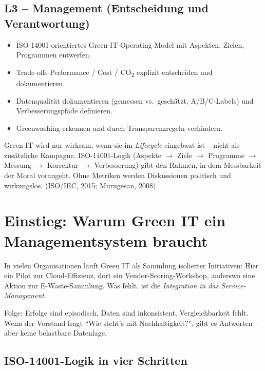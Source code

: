 \documentclass[11pt,a4paper,oneside]{article}
\newcommand{\quelle}[1]{{\footnotesize\color{lpGray}(#1)}}
\begin{document}
\subsection*{L3 -- Management (Entscheidung und Verantwortung)}
\begin{itemize}
  \item ISO-14001-orientiertes Green-IT-Operating-Model mit Aspekten, Zielen, Programmen entwerfen.
  \item Trade-offs Performance / Cost / CO\textsubscript{2} explizit entscheiden und dokumentieren.
  \item Datenqualität dokumentieren (gemessen vs.\ geschätzt, A/B/C-Labels) und Verbesserungspfade definieren.
  \item Greenwashing erkennen und durch Transparenzregeln verhindern.
\end{itemize}

\begin{merkbox}
Green IT wird nur wirksam, wenn sie im \emph{Lifecycle} eingebaut ist -- nicht als zusätzliche Kampagne. ISO-14001-Logik (Aspekte $\to$ Ziele $\to$ Programme $\to$ Messung $\to$ Korrektur $\to$ Verbesserung) gibt den Rahmen, in dem Messbarkeit der Moral vorangeht. Ohne Metriken werden Diskussionen politisch und wirkungslos. \quelle{ISO/IEC, 2015; Murugesan, 2008}
\end{merkbox}

\clearpage

\section{Einstieg: Warum Green IT ein Managementsystem braucht}

In vielen Organisationen läuft Green IT als Sammlung isolierter Initiativen: Hier ein Pilot zur Cloud-Effizienz, dort ein Vendor-Scoring-Workshop, anderswo eine Aktion zur E-Waste-Sammlung. Was fehlt, ist die \emph{Integration in das Service-Management}.

Folge: Erfolge sind episodisch, Daten sind inkonsistent, Vergleichbarkeit fehlt. Wenn der Vorstand fragt ``Wie steht's mit Nachhaltigkeit?'', gibt es Antworten -- aber keine belastbare Datenlage.

\subsection{ISO-14001-Logik in vier Schritten}
\end{document}
